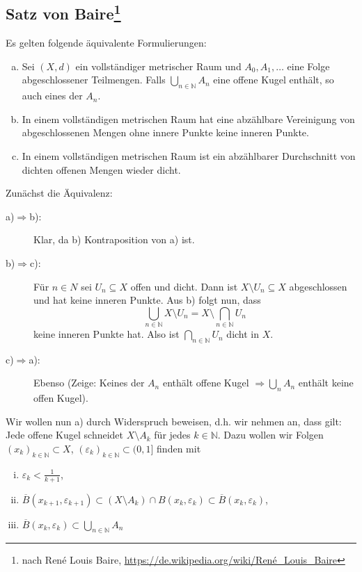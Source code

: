 \subsection[Satz von Baire]{Satz von Baire\protect\footnote{nach René Louis Baire, \url{https://de.wikipedia.org/wiki/René_Louis_Baire}}} %
\label{sub:110} 
Es gelten folgende äquivalente Formulierungen:
\begin{enumerate}[a)]
	\item Sei $(X,d)$ ein vollständiger metrischer Raum und $A_0, A_1, \ldots $ eine Folge abgeschlossener Teilmengen. Falls $\bigcup_{n \in \mathds{N}} A_n$ eine
	offene Kugel enthält, so auch eines der $A_n$.
	\item In einem vollständigen metrischen Raum hat eine abzählbare Vereinigung von abgeschlossenen Mengen ohne innere Punkte keine inneren Punkte.
	\item In einem vollständigen metrischen Raum ist ein abzählbarer Durchschnitt von dichten offenen Mengen wieder dicht.
\end{enumerate}
Zunächst die Äquivalenz: 
\begin{description}
	\item[a)$\Rightarrow$b):] Klar, da b) Kontraposition von a) ist.
	\item[b)$\Rightarrow$c):] Für $n \in N$ sei $U_n \subseteq X$ offen und dicht. Dann ist $X \setminus U_n \subseteq X$ abgeschlossen und hat keine inneren Punkte. Aus b) 
	folgt nun, dass
	\[
		\bigcup_{n \in \mathds{N}}X \setminus U_n = X \setminus \bigcap_{n \in \mathds{N}} U_n
	\]
	keine inneren Punkte hat. Also ist $\bigcap_{n \in \mathds{N}} U_n$ dicht in $X$.
	\item[c)$\Rightarrow$a):] Ebenso (Zeige: Keines der $A_n$ enthält offene Kugel $\Rightarrow \bigcup_n A_n$ enthält keine offen Kugel).
\end{description}
Wir wollen nun a) durch Widerspruch beweisen, d.h. wir nehmen an, dass gilt: Jede offene Kugel schneidet $X \setminus A_k$ für jedes $k \in \mathds{N}$. Dazu wollen wir 
Folgen $(x_k)_{k \in \mathds{N}} \subset X$, $(\varepsilon_k)_{k \in \mathds{N}} \subset (0,1]$ finden mit 
\begin{enumerate}[(i)]
	\item $\varepsilon_k < \frac{1}{k+1}$,
	\item $\overline{B}(x_{k+1}, \varepsilon_{k+1}) \subset (X \setminus A_k) \cap B(x_k, \varepsilon_k) \subset \overline{B}(x_k, \varepsilon_k)$,
	\item $\overline{B}(x_k, \varepsilon_k) \subset \bigcup_{n \in \mathds{N}} A_n$
\end{enumerate}
